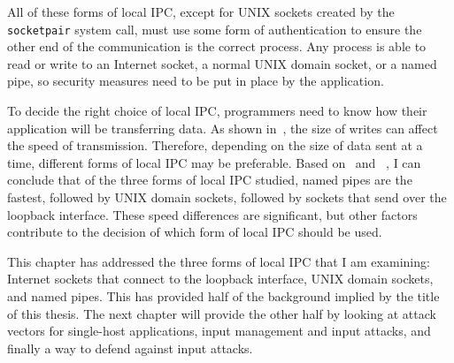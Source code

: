 All of these forms of local IPC, except for UNIX sockets created by the \texttt{socketpair} system call, must use some form of authentication to ensure the other end of the communication is the correct process.  Any process is able to read or write to an Internet socket, a normal UNIX domain socket, or a named pipe, so security measures need to be put in place by the application.

To decide the right choice of local IPC, programmers need to know how their application will be transferring data.  As shown in~\cite{Xiurong2011TheAA}, the size of writes can affect the speed of transmission.  Therefore, depending on the size of data sent at a time, different forms of local IPC may be preferable.  Based on~\cite{immich2003performance} and ~\cite{Stevens:1997:UNP:522800}, I can conclude that of the three forms of local IPC studied, named pipes are the fastest, followed by UNIX domain sockets, followed by sockets that send over the loopback interface.  These speed differences are significant, but other factors contribute to the decision of which form of local IPC should be used.

This chapter has addressed the three forms of local IPC that I am examining: Internet sockets that connect to the loopback interface, UNIX domain sockets, and named pipes.  This has provided half of the background implied by the title of this thesis.  The next chapter will provide the other half by looking at attack vectors for single-host applications, input management and input attacks, and finally a way to defend against input attacks.
